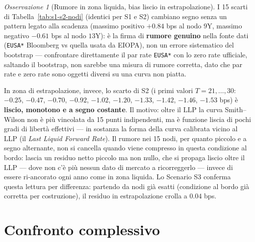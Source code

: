 \documentclass[11pt,a4paper]{article}
\theoremstyle{remark}
\newtheorem*{osservazione}{Osservazione}
\newcommand{\LLP}{\ensuremath{\mathrm{LLP}}}
\begin{document}
\begin{osservazione}[Rumore in zona liquida, bias liscio in estrapolazione]
I 15 scarti di Tabella~\ref{tab:s1-s2-nodi} (identici per S1 e S2) cambiano segno senza un
pattern legato alla scadenza (massimo positivo $+0.84$ bps al nodo $9$Y, massimo negativo
$-0.61$ bps al nodo $13$Y): \`e la firma di \textbf{rumore genuino} nella fonte dati
(\texttt{EUSA*} Bloomberg vs quella usata da EIOPA), non un errore sistematico del bootstrap
--- confrontare direttamente il par rate \texttt{EUSA*} con lo zero rate ufficiale, saltando
il bootstrap, non sarebbe una misura di rumore corretta, dato che par rate e zero rate sono
oggetti diversi su una curva non piatta.

In zona di estrapolazione, invece, lo scarto di S2 (i primi valori $T=21,\dots,30$: $-0.25$,
$-0.47$, $-0.70$, $-0.92$, $-1.02$, $-1.20$, $-1.33$, $-1.42$, $-1.46$, $-1.53$ bps) \`e
\textbf{liscio, monotono e a segno costante}. Il motivo: oltre il $\LLP$ la curva
Smith--Wilson non \`e pi\`u
vincolata da 15 punti indipendenti, ma \`e funzione liscia di pochi gradi di libert\`a
effettivi --- in sostanza la forma della curva calibrata vicino al $\LLP$ (il \emph{Last
Liquid Forward Rate}). Il rumore nei 15 nodi, per quanto piccolo e a segno alternante, non si
cancella quando viene compresso in questa condizione al bordo: lascia un residuo netto
piccolo ma non nullo, che si propaga liscio oltre il $\LLP$ --- dove non c'\`e pi\`u nessun
dato di mercato a ricorreggerlo --- invece di essere ri-ancorato ogni anno come in zona
liquida. Lo Scenario S3 conferma questa lettura per differenza: partendo da nodi gi\`a esatti
(condizione al bordo gi\`a corretta per costruzione), il residuo in estrapolazione crolla a
$0.04$ bps.
\end{osservazione}

\section{Confronto complessivo}

\begin{table}[H]
\centering
\small
{}
\caption{Le tre ricostruzioni a confronto, dicembre~2025.}
\label{tab:confronto-scenari}
\end{table}
\end{document}
